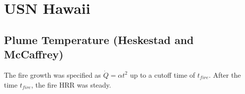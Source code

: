 



\section{USN Hawaii}

\subsection*{Plume Temperature (Heskestad and McCaffrey)}

The fire growth was specified as $\dot Q = \alpha t^2$ up to a cutoff time of $t_{fire}$.
After the time $t_{fire}$, the fire HRR was steady.

